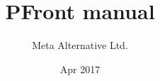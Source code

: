 

\title{PFront manual}
\author{Meta Alternative Ltd.}
\date{Apr 2017}



\maketitle

\tableofcontents

\newpage




